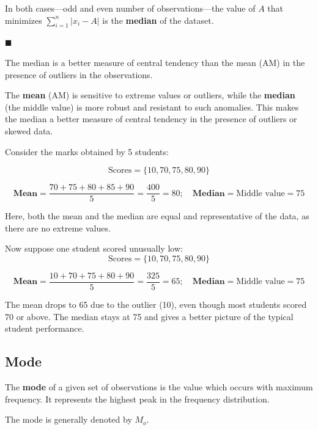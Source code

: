 \documentclass[twoside]{book}
\begin{document}
In both cases—odd and even number of observations—the value of \( A \) that minimizes \( \sum_{i=1}^{n} |x_i - A| \) is the \textbf{median} of the dataset.

    \hfill $\blacksquare$

\begin{textbox}
The median is a better measure of central tendency than the mean (AM) in the presence of outliers in the observations.
\end{textbox}

The \textbf{mean} (AM) is sensitive to extreme values or outliers, while the \textbf{median} (the middle value) is more robust and resistant to such anomalies. This makes the median a better measure of central tendency in the presence of outliers or skewed data.

Consider the marks obtained by 5 students:

\[
\text{Scores} = \{10, 70, 75, 80, 90\}
\]

\[\textbf{Mean} = \frac{70 + 75 + 80 + 85 + 90}{5} = \frac{400}{5} = 80; \quad \textbf{Median} = \text{Middle value} = 75
\]

Here, both the mean and the median are equal and representative of the data, as there are no extreme values.

Now suppose one student scored unusually low:
\[
\text{Scores} = \{10, 70, 75, 80, 90\}
\]

\[\textbf{Mean} = \frac{10 + 70 + 75 + 80 + 90}{5} = \frac{325}{5} = 65; \quad \textbf{Median} = \text{Middle value} = 75
\]

The mean drops to 65 due to the outlier (10), even though most students scored 70 or above. The median stays at 75 and gives a better picture of the typical student performance.

\subsection{Mode}
\begin{textbox}
The \textbf{mode} of a given set of observations is the value which occurs with maximum frequency. It represents the highest peak in the frequency distribution.
    \end{textbox}

The mode is generally denoted by \( M_o \).
\end{document}

